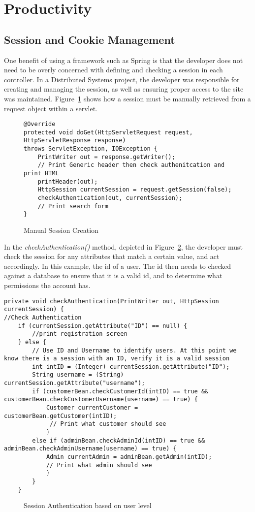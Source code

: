 \section{Productivity}

\subsection{Session and Cookie Management}
One benefit of using a framework such as Spring is that the developer does not need to be overly concerned with defining and checking a session in each controller. In a Distributed Systems project, the developer was responsible for creating and managing the session, as well as ensuring proper access to the site was maintained. Figure~\ref{fig:manualsession} shows how a session must be manually retrieved from a request object within a servlet.

\begin{figure}[H]
\begin{lstlisting}
@Override
protected void doGet(HttpServletRequest request, HttpServletResponse response)
throws ServletException, IOException {
    PrintWriter out = response.getWriter();
    // Print Generic header then check authenitcation and print HTML
    printHeader(out);
    HttpSession currentSession = request.getSession(false);
    checkAuthentication(out, currentSession);
    // Print search form
}
\end{lstlisting}
\caption{Manual Session Creation}
\label{fig:manualsession}
\end{figure}

In the \textit{checkAuthentication()} method, depicted in Figure~\ref{fig:sessionlevel}, the developer must check the session for any attributes that match a certain value, and act accordingly. In this example, the id of a user. The id then needs to checked against a database to ensure that it is a valid id, and to determine what permissions the account has.


\begin{lstlisting}
private void checkAuthentication(PrintWriter out, HttpSession currentSession) {
//Check Authentication
	if (currentSession.getAttribute("ID") == null) {
		//print registration screen
    } else {
        // Use ID and Username to identify users. At this point we know there is a session with an ID, verify it is a valid session
        int intID = (Integer) currentSession.getAttribute("ID");
        String username = (String) currentSession.getAttribute("username");
        if (customerBean.checkCustomerId(intID) == true && customerBean.checkCustomerUsername(username) == true) {
			Customer currentCustomer = customerBean.getCustomer(intID);
			 // Print what customer should see
            } 
		else if (adminBean.checkAdminId(intID) == true && adminBean.checkAdminUsername(username) == true) {
            Admin currentAdmin = adminBean.getAdmin(intID);
			// Print what admin should see   
            }
        }
	}
\end{lstlisting}
\begin{figure}[H]
\caption{Session Authentication based on user level}
\label{fig:sessionlevel}
\end{figure}

